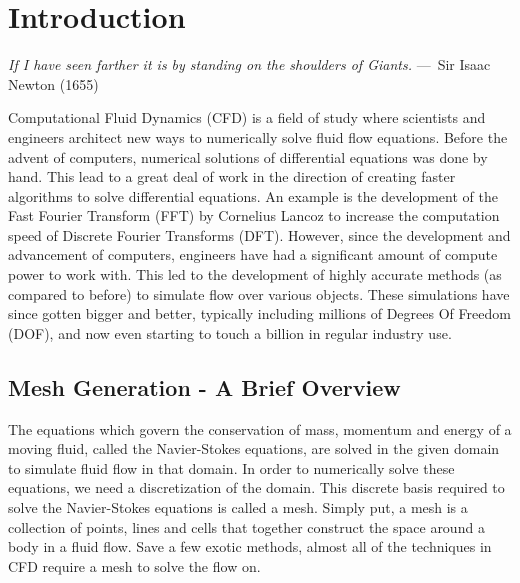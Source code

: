 
\chapter{Introduction}
\label{ch:Introduction}

\begin{epigraph}
    \emph{If I have seen farther it is by standing on the shoulders of
    Giants.} ---~Sir Isaac Newton (1655)
\end{epigraph}

Computational Fluid Dynamics (CFD) is a field of study where scientists and engineers architect new ways to numerically solve fluid flow equations. Before the advent of computers, numerical solutions of differential equations was done by hand. This lead to a great deal of work in the direction of creating faster algorithms to solve differential equations. An example is the development of the Fast Fourier Transform (FFT) by Cornelius Lancoz to increase the computation speed of Discrete Fourier Transforms (DFT). However, since the development and advancement of computers, engineers have had a significant amount of compute power to work with. This led to the development of highly accurate methods (as compared to before) to simulate flow over various objects. These simulations have since gotten bigger and better, typically including millions of Degrees Of Freedom (DOF), and now even starting to touch a billion in regular industry use.

\section{Mesh Generation - A Brief Overview}

The equations which govern the conservation of mass, momentum and energy of a moving fluid, called the Navier-Stokes equations, are solved in the given domain to simulate fluid flow in that domain. In order to numerically solve these equations, we need a discretization of the domain. This discrete basis required to solve the Navier-Stokes equations is called a mesh. Simply put, a mesh is a collection of points, lines and cells that together construct the space around a body in a fluid flow. Save a few exotic methods, almost all of the techniques in CFD require a mesh to solve the flow on.

